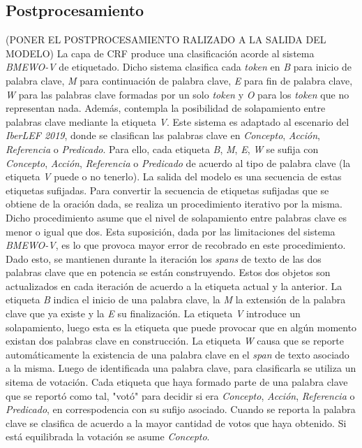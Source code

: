\subsection{Postprocesamiento}
(PONER EL POSTPROCESAMIENTO RALIZADO A LA SALIDA DEL MODELO)
La capa de CRF produce una clasificaci\'on acorde al sistema \emph{BMEWO-V} de etiquetado. Dicho sistema clasifica cada \emph{token} en \emph{B} para inicio de palabra clave, \emph{M} para continuaci\'on de palabra clave, \emph{E} para fin de palabra clave, \emph{W} para las palabras clave formadas por un solo \emph{token} y \emph{O} para los \emph{token} que no representan nada. Adem\'as, contempla la posibilidad de solapamiento entre palabras clave mediante la etiqueta \emph{V}. 
\newline
\newline
Este sistema es adaptado al escenario del \emph{IberLEF 2019}, donde se clasifican las palabras clave en \emph{Concepto}, \emph{Acci\'on}, \emph{Referencia} o \emph{Predicado}. Para ello, cada etiqueta \emph{B}, \emph{M}, \emph{E}, \emph{W} se sufija con \emph{Concepto}, \emph{Acci\'on}, \emph{Referencia} o \emph{Predicado} de acuerdo al tipo de palabra clave (la etiqueta \emph{V} puede o no tenerlo). La salida del modelo es una secuencia de estas etiquetas sufijadas. 
\newline
\newline
Para convertir la secuencia de etiquetas sufijadas que se obtiene de la oraci\'on dada, se realiza un procedimiento iterativo por la misma. Dicho procedimiento asume que el nivel de solapamiento entre palabras clave es menor o igual que dos. Esta suposici\'on, dada por las limitaciones del sistema \emph{BMEWO-V}, es lo que provoca mayor error de recobrado en este procedimiento. Dado esto, se mantienen durante la iteraci\'on los \emph{spans} de texto de las dos palabras clave que en potencia se est\'an construyendo. Estos dos objetos son actualizados en cada iteraci\'on de acuerdo a la etiqueta actual y la anterior. La etiqueta \emph{B} indica el inicio de una palabra clave, la \emph{M} la extensi\'on de la palabra clave que ya existe y la \emph{E} su finalizaci\'on. La etiqueta \emph{V} introduce un solapamiento, luego esta es la etiqueta que puede provocar que en alg\'un momento existan dos palabras clave en construcci\'on. La etiqueta \emph{W} causa que se reporte autom\'aticamente la existencia de una palabra clave en el \emph{span} de texto asociado a la misma. Luego de identificada una palabra clave, para clasificarla se utiliza un sitema de votaci\'on. Cada etiqueta que haya formado parte de una palabra clave que se report\'o como tal, "vot\'o" para decidir si era \emph{Concepto}, \emph{Acci\'on}, \emph{Referencia} o \emph{Predicado}, en correspodencia con su sufijo asociado. Cuando se reporta la palabra clave se clasifica de acuerdo a la mayor cantidad de votos que haya obtenido. Si est\'a equilibrada la votaci\'on se asume \emph{Concepto}.



















